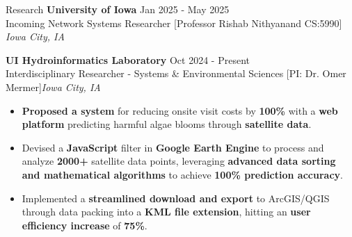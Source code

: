 \documentclass{resume} %
\begin{document}
%
\begin{rSection}{Research}
  \textbf{University of Iowa} \hfill Jan 2025 - May 2025\\
  Incoming Network Systems Researcher [Professor Rishab Nithyanand CS:5990] \hfill \textit{Iowa City, IA}
  
\textbf{UI Hydroinformatics Laboratory} 
\hfill Oct 2024 - Present\\
Interdisciplinary Researcher - Systems \& Environmental Sciences [PI: Dr. Omer Mermer]\hfill \textit{Iowa City, IA}
 \begin{itemize}
  \itemsep -3pt {} 
  \item \textbf{Proposed a system} for reducing onsite visit costs by \textbf{100\%} with a \textbf{web platform} predicting harmful algae blooms through \textbf{satellite data}.
  \item Devised a \textbf{JavaScript} filter in \textbf{Google Earth Engine} to process and analyze \textbf{2000+} satellite data points, leveraging \textbf{advanced data sorting and mathematical algorithms} to achieve \textbf{100\% prediction accuracy}.
  \item Implemented a \textbf{streamlined download and export} to ArcGIS/QGIS through data packing into a \textbf{KML file extension}, hitting an \textbf{user efficiency increase} of \textbf{75\%}. 
  \end{itemize}




\end{rSection} 
\end{document}
